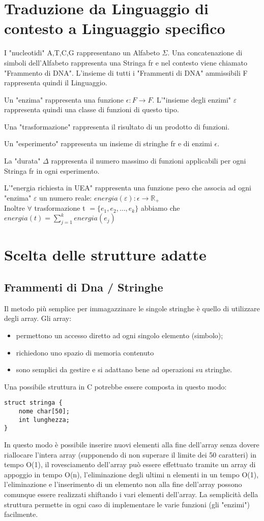 \documentclass[a4paper,10pt]{article}
\begin{document}
\section{Traduzione da Linguaggio di contesto a Linguaggio specifico}
I "nucleotidi" {A,T,C,G} rappresentano un Alfabeto $\Sigma$. Una concatenazione di simboli dell'Alfabeto rappresenta una Stringa fr e nel contesto viene chiamato "Frammento di DNA". L'insieme di tutti i "Frammenti di DNA" ammissibili {\large F} rappresenta quindi il Linguaggio.

Un "enzima" rappresenta una funzione $\epsilon\colon F\to F$. L'"insieme degli enzimi" $\varepsilon$ rappresenta quindi una classe di funzioni di questo tipo.

Una "trasformazione" rappresenta il risultato di un prodotto di funzioni.

Un "esperimento" rappresenta un insieme di stringhe fr e di enzimi $\epsilon$.

La "durata" $\Delta$ rappresenta il numero massimo di funzioni applicabili per ogni Stringa fr in ogni esperimento.

L'"energia richiesta in UEA" rappresenta una funzione peso che associa ad ogni "enzima" $\varepsilon$ un numero reale: $energia(\varepsilon)\colon\epsilon\to\mathbb{R_+}$
\\Inoltre $\forall$ trasformazione t $=\{e_1,e_2,\dots,e_k\}$ abbiamo che $energia(t)=\sum_{j=1}^k energia(e_j)$

\section{Scelta delle strutture adatte}
\subsection{Frammenti di Dna / Stringhe}\label{sec:fram}
Il metodo più semplice per immagazzinare le singole stringhe è quello di utilizzare degli array. Gli array:
\begin{itemize}
\item permettono un accesso diretto ad ogni singolo elemento (simbolo);
\item richiedono uno spazio di memoria contenuto
\item sono semplici da gestire e si adattano bene ad operazioni su stringhe. 
\end{itemize}
Una possibile struttura in C potrebbe essere composta in questo modo:
\begin{verbatim}
struct stringa {
    nome char[50];
    int lunghezza;
}
\end{verbatim} In questo modo è possibile inserire nuovi elementi alla fine dell'array senza dovere riallocare l'intera array (supponendo di non superare il limite dei 50 caratteri) in tempo O(1), il rovesciamento dell'array può essere effettuato tramite un array di appoggio in tempo O(n), l'eliminazione degli ultimi n elementi in un tempo O(1), l'eliminazione e l'inserimento di un elemento non alla fine dell'array possono comunque essere realizzati shiftando i vari elementi dell'array. La semplicità della struttura permette in ogni caso di implementare le varie funzioni (gli "enzimi") facilmente.
\end{document}
